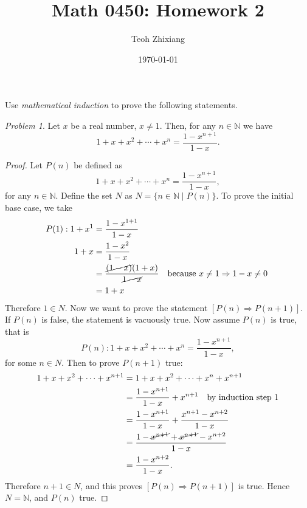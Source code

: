 \documentclass[11pt,twoside, reqno, align]{amsart}
\theoremstyle{remark}
\newtheorem{Prob}{Problem}
\def\N{\mathbb N}
\renewcommand{\implies}{\Rightarrow}
\begin{document}
\title{Math 0450: Homework 2}
\date{\today}
\author{Teoh Zhixiang}

\maketitle

Use \emph{mathematical induction} to prove the following statements.

\begin{Prob}
Let $x$ be a real number, $x \neq 1$. Then, for any $n \in \N$ we have
$$
1+x+x^2+\cdots+x^n=\frac{1-x^{n+1}}{1-x}.
$$
\end{Prob}

\begin{proof}
Let $P(n)$ be defined as
$$
1+x+x^2+\cdots+x^n=\frac{1-x^{n+1}}{1-x},
$$
for any $n \in \N$. Define the set $N$ as $N = \{ n \in \N \mid P(n)\}$. To prove the initial base case, we take
\begin{align*}
P(1): 1 + x^1 & = \frac{1-x^{1+1}}{1-x} \\
    1 + x & = \frac{1-x^2}{1-x} \\
    & = \frac{\cancel{(1-x)}(1+x)}{\cancel{1-x}} \quad \text{because $x \neq 1 \implies 1-x \neq 0$ } \\
    & = 1 + x
\end{align*}
Therefore $1 \in N$. Now we want to prove the statement $[P(n) \implies P(n+1)]$. If $P(n)$ is false, the statement is vacuously true. Now assume $P(n)$ is true, that is
\begin{equation}
    P(n): 1+x+x^2+\cdots+x^n=\frac{1-x^{n+1}}{1-x},
\end{equation}
for some $n \in N$. Then to prove $P(n+1)$ true:
\begin{align*}
    1 + x + x^2 + \cdots + x^{n+1} & = 1 + x + x^2 + \cdots + x^n + x^{n+1} \\
    & = \frac{1-x^{n+1}}{1-x} + x^{n+1} \quad \text{by induction step 1} \\
    & = \frac{1-x^{n+1}}{1-x} + \frac{x^{n+1} - x^{n+2}}{1-x} \\
    & = \frac{1 - \cancel{x^{n+1}} + \cancel{x^{n+1}} - x^{n+2}}{1-x} \\
    & = \frac{1 - x^{n+2}}{1-x}.
\end{align*}
Therefore ${n+1} \in N$, and this proves $[P(n) \implies P(n+1)]$ is true. Hence $N = \N$, and $P(n)$ true.
\end{proof}

\paragraph{}
\end{document}

